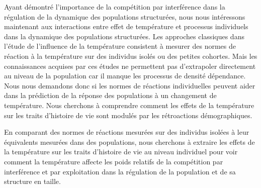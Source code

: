 Ayant démontré l'importance de la compétition par interférence dans la
régulation de la dynamique des populations structurées, nous nous intéressons
maintenant aux interactions entre effet de température et processus individuels
dans la dynamique des populations structurées. Les approches classiques dans
l'étude de l'influence de la température consistent à mesurer des normes de
réaction à la température sur des individus isolés ou des petites cohortes. Mais
les connaissances acquises par ces études ne permettent pas d'extrapoler
directement au niveau de la population car il manque les processus de densité
dépendance. Nous nous demandons donc si les normes de réactions individuelles
peuvent aider dans la prédiction de la réponse des populations à un changement
de température. Nous cherchons à comprendre comment les effets de la température
sur les traits d'histoire de vie sont modulés par les rétroactions
démographiques.

En comparant des normes de réactions mesurées sur des individus isolées à leur
équivalents mesurées dans des populations, nous cherchons à extraire les effets
de la température sur les traits d'histoire de vie au niveau individuel pour
voir comment la température affecte les poids relatifs de la compétition par
interférence et par exploitation dans la régulation de la population et de sa
structure en taille.

